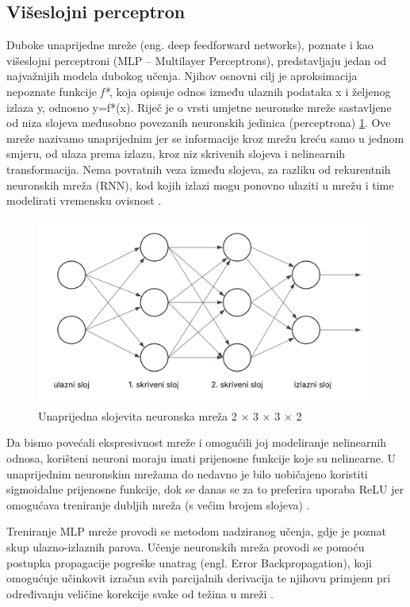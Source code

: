 \documentclass[zavrsnirad]{fer}
\begin{document}
\subsection{Višeslojni perceptron}
\label{pog:viseslojni_perceptron}
Duboke unaprijedne mreže (eng. deep feedforward networks), poznate i kao višeslojni perceptroni (MLP – Multilayer Perceptrons), predstavljaju jedan od najvažnijih modela dubokog učenja. 
Njihov osnovni cilj je aproksimacija nepoznate funkcije \textit{f*}, koja opisuje odnos između ulaznih podataka x i željenog izlaza y, odnosno y=f*(x). 
Riječ je o vrsti umjetne neuronske mreže sastavljene od niza slojeva međusobno povezanih neuronskih jedinica (perceptrona) \ref{fig:mlp}. 
Ove mreže nazivamo unaprijednim jer se informacije kroz mrežu kreću samo u jednom smjeru, od ulaza prema izlazu, kroz niz skrivenih slojeva i nelinearnih transformacija. 
Nema povratnih veza između slojeva, za razliku od rekurentnih neuronskih mreža (RNN), kod kojih izlazi mogu ponovno ulaziti u mrežu i time modelirati vremensku ovisnost \cite{Goodfellow-et-al-2016}.
\begin{figure}[H]
  \centering
  \includegraphics[width=0.6\linewidth]{Figures/mlp.png}
  \caption{Unaprijedna slojevita neuronska mreža 2 × 3 × 3 × 2 \cite{prezentacijaMLP}}
  \label{fig:mlp}
\end{figure}
Da bismo povećali ekspresivnost mreže i omogućili joj modeliranje nelinearnih odnosa, korišteni neuroni moraju imati prijenosne funkcije koje su nelinearne.
U unaprijednim neuronskim mrežama do nedavno je bilo uobičajeno koristiti sigmoidalne prijenosne funkcije, dok se danas se za to preferira uporaba ReLU jer omogućava treniranje dubljih mreža (s većim brojem slojeva) \cite{dalbelo2020neuronske}.

Treniranje MLP mreže provodi se metodom nadziranog učenja, gdje je poznat skup ulazno-izlaznih parova. 
Učenje neuronskih mreža provodi se pomoću postupka propagacije pogreške unatrag (engl. Error Backpropagation), koji omogućuje učinkovit izračun svih parcijalnih derivacija te njihovu primjenu pri određivanju veličine korekcije svake od težina u mreži \cite{dalbelo2020neuronske}.
\end{document}
